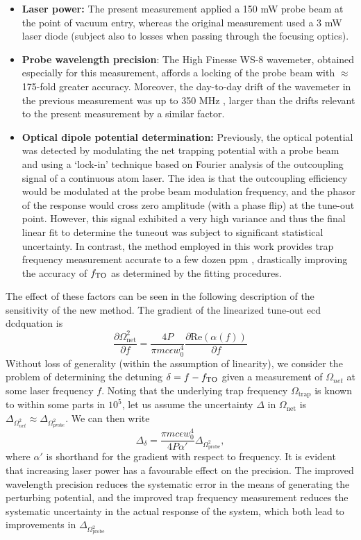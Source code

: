 	\begin{itemize}
		\item \textbf{Laser power:} The present measurement applied a 150 mW probe beam at the point of vacuum entry, whereas the original measurement used a 3 mW laser diode (subject also to losses when passing through the focusing optics). 
		\item \textbf{Probe wavelength precision}: The High Finesse WS-8 wavemeter, obtained especially for this measurement, affords a locking of the probe beam with $\approx$175-fold greater accuracy. Moreover, the day-to-day drift of the wavemeter in the previous measurement was up to 350 MHz \cite{HensonHonsThesis}, larger than the drifts relevant to the present measurement by a similar factor. 
		\item \textbf{Optical dipole potential determination:} Previously, the optical potential was detected by modulating the net trapping potential with a probe beam and using a `lock-in' technique \cite{HensonHonsThesis} based on Fourier analysis of the outcoupling signal of a continuous atom laser. The idea is that the outcoupling efficiency would be modulated at the probe beam modulation frequency, and the phasor of the response would cross zero amplitude (with a phase flip) at the tune-out point. However, this signal exhibited a very high variance and thus the final linear fit to determine the tuneout was subject to significant statistical uncertainty. In contrast, the method employed in this work provides trap frequency measurement accurate to a few dozen ppm \cite{Henson22_PAL}, drastically improving the accuracy of $f_\mathrm{TO}$ as determined by the fitting procedures.
	\end{itemize}

	The effect of these factors can be seen in the following description of the sensitivity of the new method.
	The gradient of the linearized tune-out ecd dcdquation is
	\begin{equation}
		\frac{\partial \Omega_\textrm{net}^{2}}{\partial f} = \frac{4P}{\pi m c \epsilon w_0^4}\frac{\partial \textrm{Re}(\alpha(f))}{\partial f}
	\end{equation}
	Without loss of generality (within the assumption of linearity), we consider the problem of determining the detuning $\delta = f-f_\mathrm{TO}$ given a measurement of $\Omega_{net}$ at some laser frequency $f$.  Noting that the underlying trap frequency $\Omega_\textrm{trap}$ is known to within some parts in $10^5$, let us assume the uncertainty $\Delta$ in $\Omega_\textrm{net}$ is $\Delta_{\Omega_{net}^2}\approx\Delta_{\Omega_{probe}^2}$. We can then write
	\begin{equation}
		\Delta_{\delta} = \frac{\pi m c \epsilon w_0^4}{4P\alpha'}\Delta_{\Omega_{\textrm{probe}}^{2}},
	\end{equation}
	where $\alpha'$ is shorthand for the gradient with respect to frequency. It is evident that increasing laser power has a favourable effect on the precision. The improved wavelength precision reduces the systematic error in the means of generating the perturbing potential, and the improved trap frequency measurement reduces the systematic uncertainty in the actual response of the system, which both lead to improvements in $\Delta_{\Omega_{\textrm{probe}}^{2}}$


